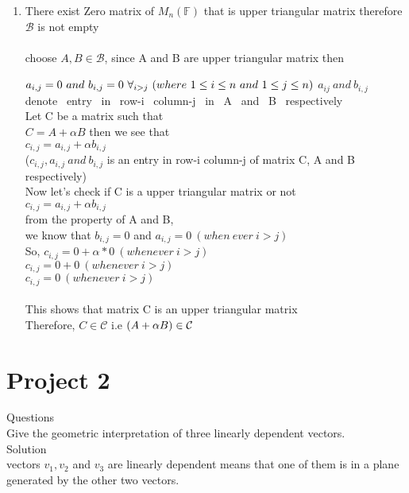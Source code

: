 \documentclass[45pt]{article}
\begin{document}
\begin{enumerate}
\item There exist Zero matrix of $M_n(\mathbb{F})$ that is upper triangular matrix therefore $\mathcal{B}$ is not empty\\\\
choose $A, B \in \mathcal{B} $, since A and B are upper triangular matrix then 

$ a_{i,j}=0 ~ and ~ b_{i,j}=0~ \forall_{i>j} ~ (where ~ 1 \leq i \leq n ~and ~1 \leq j \leq n )\\$
$a_{ij} ~ and ~ b_{i,j}$~ denote~ entry~ in~ row-i ~column-j ~in ~A~ and ~B~ respectively\\
Let C be a matrix  such that \\
$C= A+ \alpha B $ then we see that \\
$c_{i,j}=a_{i,j}+\alpha b_{i,j} $\\
($ c_{i,j},a_{i,j}~ and ~b_{i,j} $ is an entry in row-i column-j of matrix C, A and B respectively)\\

Now let's check if C is a upper triangular matrix or not\\
$c_{i,j}=a_{i,j}+\alpha b_{i,j} $\\
from the property of A and B,\\ we know that $b_{i,j}=0$ and $a_{i,j}=0 ~(when~ever ~i>j)$\\
So, $c_{i,j}=0+\alpha *0 ~(whenever~ i > j)$\\
$c_{i,j}=0+0 ~(whenever ~i>j)$ \\
$c_{i,j}=0 ~(whenever ~ i>j)$ \\\\
This shows that matrix C is an upper triangular matrix\\
Therefore, $ C \in \mathcal{C} $ i.e $(A+\alpha B) \in \mathcal{C}\\\\$
\end{enumerate}
\vspace{2,0cm}
\section*{\Huge{Project 2}}
\Large{Questions}\\
Give the geometric interpretation of three linearly dependent vectors.\\

\Large{Solution}\\

vectors $v_1,v_2$ and $v_3$ are linearly dependent means that one of them is in a plane generated by the other two vectors.
\end{document}
